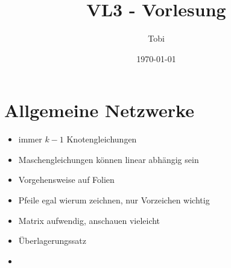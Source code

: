 \documentclass[a4paper,12pt]{article}
\title{VL3 - Vorlesung}
\author{Tobi}
\date{\today}
\begin{document}
\maketitle
\tableofcontents
\newpage

\section*{Allgemeine Netzwerke}

\begin{itemize}
    \item immer $k-1$ Knotengleichungen
    \item Maschengleichungen können linear abhängig sein 
    \item Vorgehensweise auf Folien
    \item Pfeile egal wierum zeichnen, nur Vorzeichen wichtig
    \item Matrix aufwendig, anschauen vieleicht
    \item Überlagerungssatz
    \item 
\end{itemize}
\end{document}

